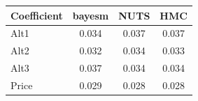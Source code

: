 \begin{tabular}{lccc}
\toprule
Coefficient & bayesm & NUTS & HMC \\
\midrule
Alt1 & 0.034 & 0.037 & 0.037 \\
Alt2 & 0.032 & 0.034 & 0.033 \\
Alt3 & 0.037 & 0.034 & 0.034 \\
Price & 0.029 & 0.028 & 0.028 \\
\bottomrule
\end{tabular}

